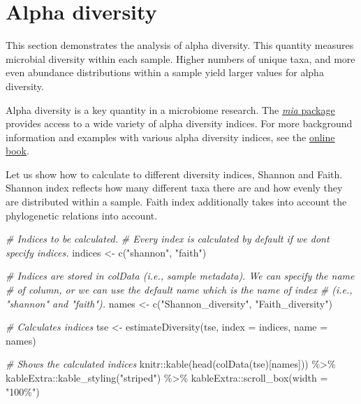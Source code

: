 \documentclass[
]{book}
\newenvironment{Shaded}{\begin{snugshade}}{\end{snugshade}}
\newcommand{\AttributeTok}[1]{\textcolor[rgb]{0.77,0.63,0.00}{#1}}
\newcommand{\CommentTok}[1]{\textcolor[rgb]{0.56,0.35,0.01}{\textit{#1}}}
\newcommand{\FunctionTok}[1]{\textcolor[rgb]{0.00,0.00,0.00}{#1}}
\newcommand{\NormalTok}[1]{#1}
\newcommand{\OtherTok}[1]{\textcolor[rgb]{0.56,0.35,0.01}{#1}}
\newcommand{\SpecialCharTok}[1]{\textcolor[rgb]{0.00,0.00,0.00}{#1}}
\newcommand{\StringTok}[1]{\textcolor[rgb]{0.31,0.60,0.02}{#1}}
\begin{document}
\hypertarget{alpha-diversity}{%
\chapter{Alpha diversity}\label{alpha-diversity}}

This section demonstrates the analysis of alpha diversity. This
quantity measures microbial diversity within each sample. Higher
numbers of unique taxa, and more even abundance distributions within a
sample yield larger values for alpha diversity.

Alpha diversity is a key quantity in a microbiome research. The \href{https://microbiome.github.io/mia/}{\emph{mia}
package} provides access to a wide
variety of alpha diversity indices. For more background information
and examples with various alpha diversity indices, see the \href{https://microbiome.github.io/OMA/microbiome-diversity.html\#alpha-diversity}{online
book}.

Let us show how to calculate to different diversity indices, Shannon
and Faith. Shannon index reflects how many different taxa there are
and how evenly they are distributed within a sample. Faith index
additionally takes into account the phylogenetic relations into
account.

\begin{Shaded}
\begin{Highlighting}[]
\CommentTok{\# Indices to be calculated. }
\CommentTok{\# Every index is calculated by default if we don\textquotesingle{}t specify indices.}
\NormalTok{indices }\OtherTok{\textless{}{-}} \FunctionTok{c}\NormalTok{(}\StringTok{"shannon"}\NormalTok{, }\StringTok{"faith"}\NormalTok{)}

\CommentTok{\# Indices are stored in colData (i.e., sample metadata). We can specify the name}
\CommentTok{\# of column, or we can use the default name which is the name of index }
\CommentTok{\# (i.e., "shannon" and "faith"). }
\NormalTok{names }\OtherTok{\textless{}{-}} \FunctionTok{c}\NormalTok{(}\StringTok{"Shannon\_diversity"}\NormalTok{, }\StringTok{"Faith\_diversity"}\NormalTok{)}

\CommentTok{\# Calculates indices}
\NormalTok{tse }\OtherTok{\textless{}{-}} \FunctionTok{estimateDiversity}\NormalTok{(tse, }\AttributeTok{index =}\NormalTok{ indices, }\AttributeTok{name =}\NormalTok{ names)}

\CommentTok{\# Shows the calculated indices}
\NormalTok{knitr}\SpecialCharTok{::}\FunctionTok{kable}\NormalTok{(}\FunctionTok{head}\NormalTok{(}\FunctionTok{colData}\NormalTok{(tse)[names])) }\SpecialCharTok{\%\textgreater{}\%}\NormalTok{ kableExtra}\SpecialCharTok{::}\FunctionTok{kable\_styling}\NormalTok{(}\StringTok{"striped"}\NormalTok{) }\SpecialCharTok{\%\textgreater{}\%} 
\NormalTok{  kableExtra}\SpecialCharTok{::}\FunctionTok{scroll\_box}\NormalTok{(}\AttributeTok{width =} \StringTok{"100\%"}\NormalTok{)}
\end{Highlighting}
\end{Shaded}
\end{document}
